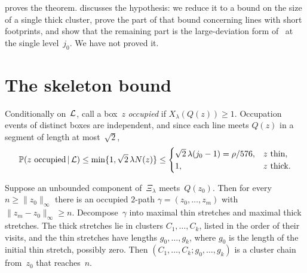 \documentclass[11pt,letterpaper]{article}
\begin{document}
 proves the theorem.  discusses the hypothesis: we reduce it to a bound on the size of a single thick cluster, prove the part of that bound concerning lines with short footprints, and show that the remaining part is the large-deviation form of~\cite[Conjecture~1.2]{GA26} at the single level~$j_0$. We have not proved it.

\section{The skeleton bound}
\label{sec:skeleton}

Conditionally on~$\mathcal L$, call a box~$z$ \emph{occupied} if $X_\lambda(Q(z))\ge1$. Occupation events of distinct boxes are independent, and since each line meets $Q(z)$ in a segment of length at most~$\sqrt2$,
\begin{equation}
\label{eq:occ}
  \mathbb P(z\text{ occupied}\,\vert\,\mathcal L)\le\min\{1,\sqrt2\,\lambda N(z)\}\le
  \begin{cases}\sqrt2\,\lambda(j_0-1)=\rho/576,& z\text{ thin},\\ 1,& z\text{ thick}.\end{cases}
\end{equation}

\begin{lemma}
\label{lem:skeleton}
Suppose an unbounded component of~$\Xi_\lambda$ meets~$Q(z_0)$. Then for every $n\ge\lVert z_0\rVert_\infty$ there is an occupied $2$-path $\gamma=(z_0,\dots,z_m)$ with $\lVert z_m-z_0\rVert_\infty\ge n$. Decompose~$\gamma$ into maximal thin stretches and maximal thick stretches. The thick stretches lie in clusters $C_1,\dots,C_k$, listed in the order of their visits, and the thin stretches have lengths $g_0,\dots,g_k$, where $g_0$ is the length of the initial thin stretch, possibly zero. Then $(C_1,\dots,C_k;g_0,\dots,g_k)$ is a cluster chain from~$z_0$ that reaches~$n$.
\end{lemma}
\end{document}
